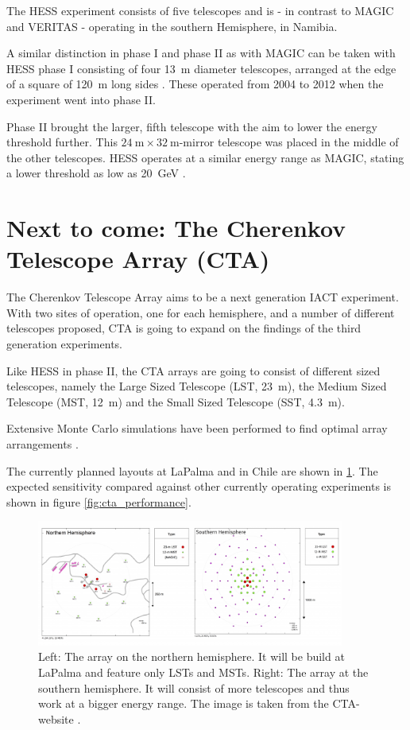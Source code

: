 The HESS experiment consists of five telescopes and 
is - in contrast to MAGIC and VERITAS - operating in the southern 
Hemisphere, in Namibia.

A similar distinction in phase I and phase II as with MAGIC can be taken with 
HESS phase I consisting of four \SI{13}{\meter} diameter telescopes,
arranged at the edge of a square of \SI{120}{\meter} long sides \cite{HINTON2004331}.
These operated from 2004 to 2012 when the experiment went into phase II.

Phase II brought the larger, fifth telescope with the aim to lower the energy threshold
further. This $\SI{24}{\meter} \times \SI{32}{\meter}$-mirror telescope 
was placed in the middle of the other telescopes.
HESS operates at a similar energy range as MAGIC, stating a lower threshold as low as 
\SI{20}{\giga\electronvolt} \cite{vincent2005hess}.


\section{Next to come: The Cherenkov Telescope Array (CTA)}
\label{sec:cta}

The Cherenkov Telescope Array aims to be a next generation IACT experiment.
With two sites of operation, one for each hemisphere, and a number of different 
telescopes proposed, CTA is going to expand on the findings of the third 
generation experiments.

Like HESS in phase II, the CTA arrays are going to consist of different sized telescopes, namely
the Large Sized Telescope (LST, \SI{23}{\meter}), 
the Medium Sized Telescope (MST, \SI{12}{\meter}) 
and the Small Sized Telescope (SST, \SI{4.3}{\meter}).

Extensive Monte Carlo simulations have been performed to find optimal array arrangements
\cite{BERNLOHR2013171}.

The currently planned layouts at LaPalma and in Chile are shown in 
\ref{fig:cta_layout}.
The expected sensitivity compared against other currently operating
experiments is shown in figure \ref{fig:cta_performance}.

\begin{figure}[H]
	\center
	\captionsetup{width=0.9\linewidth}
	\includegraphics[width=0.9\textwidth]{images/cta_layout.png}
	\caption{
	Left: The array on the northern hemisphere. It will be build at LaPalma
	and feature only LSTs and MSTs.
	Right: The array at the southern hemisphere.
	It will consist of more telescopes and thus 
	work at a bigger energy range.
	The image is taken from the CTA-website \cite{cta_web}.}
	\label{fig:cta_layout}
\end{figure}

